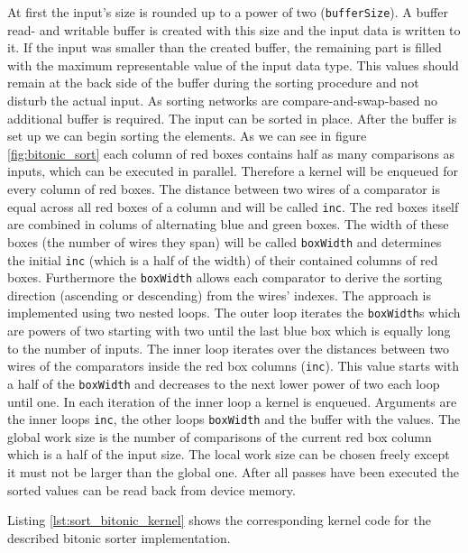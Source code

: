 At first the input's size is rounded up to a power of two (\lstinline!bufferSize!). A buffer read- and writable buffer is created with this size and the input data is written to it. If the input was smaller than the created buffer, the remaining part is filled with the maximum representable value of the input data type. This values should remain at the back side of the buffer during the sorting procedure and not disturb the actual input. As sorting networks are compare-and-swap-based no additional buffer is required. The input can be sorted in place.
After the buffer is set up we can begin sorting the elements. As we can see in figure \ref{fig:bitonic_sort} each column of red boxes contains half as many comparisons as inputs, which can be executed in parallel. Therefore a kernel will be enqueued for every column of red boxes. The distance between two wires of a comparator is equal across all red boxes of a column and will be called \lstinline!inc!. The red boxes itself are combined in colums of alternating blue and green boxes. The width of these boxes (the number of wires they span) will be called \lstinline!boxWidth! and determines the initial \lstinline!inc! (which is a half of the width) of their contained columns of red boxes. Furthermore the \lstinline!boxWidth! allows each comparator to derive the sorting direction (ascending or descending) from the wires' indexes.
The approach is implemented using two nested loops. The outer loop iterates the \lstinline!boxWidth!s which are powers of two starting with two until the last blue box which is equally long to the number of inputs. The inner loop iterates over the distances between two wires of the comparators inside the red box columns (\lstinline!inc!). This value starts with a half of the \lstinline!boxWidth! and decreases to the next lower power of two each loop until one.
In each iteration of the inner loop a kernel is enqueued. Arguments are the inner loops \lstinline!inc!, the other loops \lstinline!boxWidth! and the buffer with the values. The global work size is the number of comparisons of the current red box column which is a half of the input size. The local work size can be chosen freely except it must not be larger than the global one.
After all passes have been executed the sorted values can be read back from device memory.

Listing \ref{lst:sort_bitonic_kernel} shows the corresponding kernel code for the described bitonic sorter implementation.




